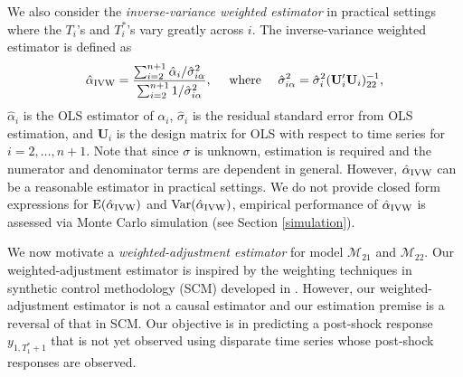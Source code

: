 \documentclass[11pt]{article}
\def\mbf#1{\mathbf{#1}} %
\def\mc#1{\mathcal{#1}} %
\def\E#1{\mathrm{E}(#1)} %
\def\var#1{\mathrm{Var}(#1)} %
\theoremstyle{definition}
\begin{document}
We also consider the \emph{inverse-variance weighted estimator} 
in practical settings where the $T_i$'s and $T_i^*$'s vary greatly across $i$. 
The inverse-variance weighted estimator is defined as 
\begin{align*}
  \hat{\alpha}_{\rm IVW} = \frac{\sum_{i=2}^{n+1} \hat{\alpha}_i / \hat{\sigma}_{i\alpha}^2}{\sum_{i=2}^{n+1} 1/\hat{\sigma}_{i\alpha}^2},
  \quad \text{ where } \quad  \hat{\sigma}_{i\alpha}^2 = \hat{\sigma}^2_i( \mathbf{U}_i'\mbf{U}_i)_{22}^{-1},
\end{align*}
 $\hat{\alpha}_i$ is the OLS estimator of $\alpha_i$, 
$\hat{\sigma}_i$ is the residual standard error from OLS estimation, 
and $\mbf{U}_i$ is the design matrix for OLS with respect to time series 
for $i = 2, \ldots, n+1$. Note that since $\sigma$ is unknown, estimation 
is required and the numerator and denominator terms are dependent in general. 
However, $\hat{\alpha}_{\rm IVW}$ can be a reasonable estimator in 
practical settings. %
We do not provide closed form expressions for $\E{\hat{\alpha}_{\rm IVW}}$ 
and $\var{\hat{\alpha}_{\rm IVW}}$, empirical performance of 
$\hat{\alpha}_{\rm IVW}$ is assessed via Monte Carlo simulation 
(see Section \ref{simulation}).

We now motivate a \emph{weighted-adjustment estimator} for model $\mc{M}_{21}$ 
and $\mc{M}_{22}$. Our weighted-adjustment estimator is inspired by the 
weighting techniques in synthetic control methodology (SCM) developed 
in \cite{abadie2010synthetic}. 
However, our weighted-adjustment estimator is not a causal estimator and 
our estimation premise is a reversal of that in SCM. 
Our objective is in predicting a post-shock response $y_{1,T_1^*+1}$ that is not yet 
observed using disparate time series whose post-shock responses are observed.
\end{document}
